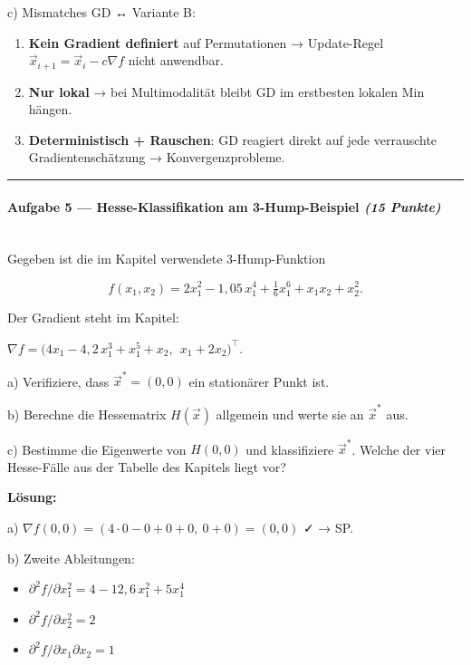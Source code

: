 \documentclass[11pt, a4paper]{article}
\begin{document}
c) Mismatches GD ↔ Variante B:

\begin{enumerate}
  \item \textbf{Kein Gradient definiert} auf Permutationen → Update-Regel $\vec x_{i+1} = \vec x_i - c\nabla f$ nicht anwendbar.
  \item \textbf{Nur lokal} → bei Multimodalität bleibt GD im erstbesten lokalen Min hängen.
  \item \textbf{Deterministisch + Rauschen}: GD reagiert direkt auf jede verrauschte Gradientenschätzung → Konvergenzprobleme.
\end{enumerate}


\noindent\textcolor{rulegray}{\rule{\linewidth}{0.4pt}}


\paragraph{Aufgabe 5 — Hesse-Klassifikation am 3-Hump-Beispiel \textit{(15 Punkte)}}\mbox{}\\[2pt]

Gegeben ist die im Kapitel verwendete 3-Hump-Funktion

\[
f(x_1,x_2) = 2x_1^2 - 1{,}05\, x_1^4 + \tfrac{1}{6}x_1^6 + x_1 x_2 + x_2^2.
\]

Der Gradient steht im Kapitel:

$\nabla f = \big(4x_1 - 4{,}2\, x_1^3 + x_1^5 + x_2,\ \ x_1 + 2x_2\big)^\top.$


a) Verifiziere, dass $\vec x^* = (0,0)$ ein stationärer Punkt ist.


b) Berechne die Hessematrix $H(\vec x)$ allgemein und werte sie an $\vec x^*$ aus.


c) Bestimme die Eigenwerte von $H(0,0)$ und klassifiziere $\vec x^*$. Welche der vier Hesse-Fälle aus der Tabelle des Kapitels liegt vor?


\textbf{Lösung:}


a) $\nabla f(0,0) = (4\cdot 0 - 0 + 0 + 0,\ 0 + 0) = (0,0)$ ✓ → SP.


b) Zweite Ableitungen:

\begin{itemize}
  \item $\partial^2 f/\partial x_1^2 = 4 - 12{,}6\, x_1^2 + 5x_1^4$
  \item $\partial^2 f/\partial x_2^2 = 2$
  \item $\partial^2 f/\partial x_1 \partial x_2 = 1$
\end{itemize}
\end{document}
